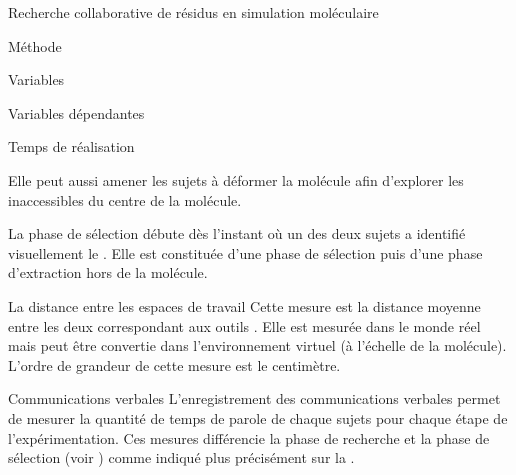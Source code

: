 \documentclass[myfrancais]{mythesis}
\begin{document}
\begin{mychapter}{Recherche collaborative de résidus en simulation moléculaire}
\begin{mysection}{Méthode}
\begin{mysubsection}{Variables}
\begin{mysubsubsection}{Variables dépendantes}
\begin{myparagraph}{ Temps de réalisation}
\begin{description}
								Elle peut aussi amener les sujets à déformer la molécule afin d'explorer les  inaccessibles du centre de la molécule.
							\item[La sélection] La phase de sélection débute dès l'instant où un des deux sujets a identifié visuellement le .
								Elle est constituée d'une phase de sélection puis d'une phase d'extraction hors de la molécule.
						\end{description}
					\end{myparagraph}
					\begin{myparagraph}{ La distance entre les espaces de travail}
						Cette mesure est la distance moyenne entre les deux  correspondant aux outils .
						Elle est mesurée dans le monde réel mais peut être convertie dans l'environnement virtuel (à l'échelle de la molécule).
						L'ordre de grandeur de cette mesure est le centimètre.
					\end{myparagraph}
					\begin{myparagraph}{ Communications verbales}
						L'enregistrement des communications verbales permet de mesurer la quantité de temps de parole de chaque sujets pour chaque étape de l'expérimentation.
						Ces mesures différencie la phase de recherche et la phase de sélection (voir ) comme indiqué plus précisément sur la .


\end{myparagraph}
\end{mysubsubsection}
\end{mysubsection}
\end{mysection}
\end{mychapter}
\end{document}

